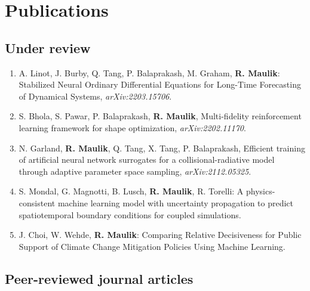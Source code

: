 \documentclass[letterpaper]{article}
\begin{document}
\section*{Publications}

\subsection*{Under review}

\begin{enumerate}

\item A. Linot, J. Burby, Q. Tang, P. Balaprakash, M. Graham, \textbf{R. Maulik}: Stabilized Neural Ordinary Differential Equations for Long-Time Forecasting of Dynamical Systems, {\it arXiv:2203.15706}.

\item S. Bhola, S. Pawar, P. Balaprakash, \textbf{R. Maulik}, Multi-fidelity reinforcement learning framework for shape optimization, {\it arXiv:2202.11170}.

\item N. Garland, \textbf{R. Maulik}, Q. Tang, X. Tang, P. Balaprakash, Efficient training of artificial neural network surrogates for a collisional-radiative model through adaptive parameter space sampling, {\it arXiv:2112.05325}.

\item S. Mondal, G. Magnotti, B. Lusch, \textbf{R. Maulik}, R. Torelli: A physics-consistent machine learning model with uncertainty propagation to predict spatiotemporal boundary conditions for coupled simulations.

\item J. Choi, W. Wehde, \textbf{R. Maulik}: Comparing Relative Decisiveness for Public Support of Climate Change Mitigation Policies Using Machine Learning.

\end{enumerate}


\subsection*{Peer-reviewed journal articles}
\end{document}
